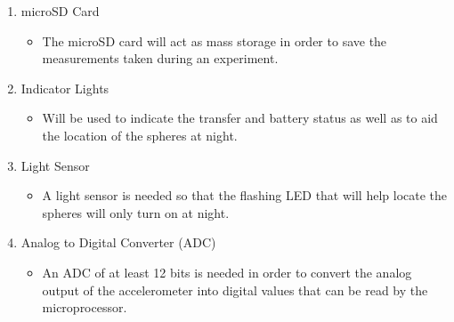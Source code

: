 \begin{enumerate}
\item  microSD Card
\begin{itemize}
\item The microSD card will act as mass storage in order to save the measurements taken during an experiment.
\end{itemize}


\item  Indicator Lights
\begin{itemize}
\item Will be used to indicate the transfer and battery status as well as to aid the location of the spheres at night.
\end{itemize}

\item  Light Sensor
\begin{itemize}
\item A light sensor is needed so that the flashing LED that will help locate the spheres will only turn on at night.
\end{itemize}


\item  Analog to Digital Converter (ADC)
\begin{itemize}
\item An ADC of at least 12 bits is needed in order to convert the analog output of the accelerometer into digital values that can be read by the microprocessor.
\end{itemize}

\end{enumerate}

